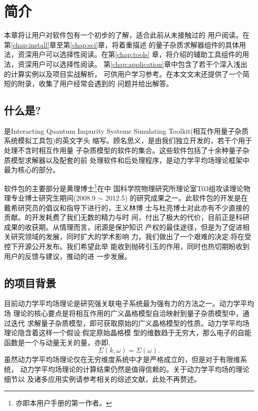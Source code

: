 \chapter{{\iqist}简介}
\label{chap:intro}

本章将让用户对{\iqist}软件包有一个初步的了解，适合此前从未接触过{\iqist}的
用户阅读。在第\ref{chap:install}章至第\ref{chap:sci}章，将着重描述{\iqist}
的量子杂质求解器组件的具体用法，资深用户可以选择性阅读。在第\ref{chap:tools}
章，将介绍{\iqist}的辅助工具组件的用法，资深用户可以选择性阅读。
第\ref{chap:application}章中包含了若干个深入浅出的计算实例以及项目实战解析，
可供用户学习参考。在本文文末还提供了一个简短的附录，收集了用户经常会遇到的
问题并给出解答。

\section{什么是{\iqist}?}
\label{sec:whatisit}

{\iqist}是{\color{red}I}nteracting {\color{cyan}Q}uantum {\color{cyan}I}mpurity {\color{cyan}S}ystems 
Simulating {\color{cyan}T}oolkit(相互作用量子杂质系统模拟工具包)的英文字头
缩写。顾名思义，{\iqist}是由我们独立开发的，若干个用于处理不含时相互作用量
子杂质模型的软件的集合。这些软件包括了十余种量子杂质模型求解器以及配套的前
处理软件和后处理程序，是动力学平均场理论框架中最为核心的部分。

{\iqist}软件包的主要部分是黄理博士\footnote{亦即本用户手册的第一作者。}在中
国科学院物理研究所理论室T03组攻读理论物理专业博士研究生期间(2008.9 $\sim$ 2012.5)
的研究成果之一。此软件包的开发是在戴希研究员的倡议和指导下进行的，王义林博
士与杜亮博士对此亦有不少直接的贡献。{\iqist}的开发耗费了我们无数的精力与时
间，付出了极大的代价，目前正是科研成果的收获期。从情理而言，闭源是保护知识
产权的最佳途径，但是为了促进相关研究领域的发展，同时扩大{\iqist}的学术影响
力，我们做出了一个艰难的决定:将{\iqist}在受控下开源公开发布。我们希望此举
能收到抛砖引玉的作用，同时也热切期盼收到用户的反馈与建议，推动{\iqist}的进
一步发展。

\section{{\iqist}的项目背景}
\label{sec:background}

目前动力学平均场理论是研究强关联电子系统最为强有力的方法之一。动力学平均场
理论的核心要点是将相互作用的广义晶格模型自洽映射到量子杂质模型中，通过迭代
求解量子杂质模型，即可获取原始的广义晶格模型的性质\cite{georges:13,
kotliar:865,held:2007}。动力学平均场理论隐含着这样一个假设:假定原始晶格模
型的维数趋于无穷大，那么电子的自能函数是一个与动量无关的量，亦即,
\begin{equation}
\Sigma(k,\omega) = \Sigma(\omega).
\end{equation}
虽然动力学平均场理论仅在无穷维度系统中才是严格成立的，但是对于有限维系统，
动力学平均场理论的计算结果仍然是值得信赖的。关于动力学平均场的理论细节以
及诸多应用实例请参考相关的综述文献，此处不再赘述。


